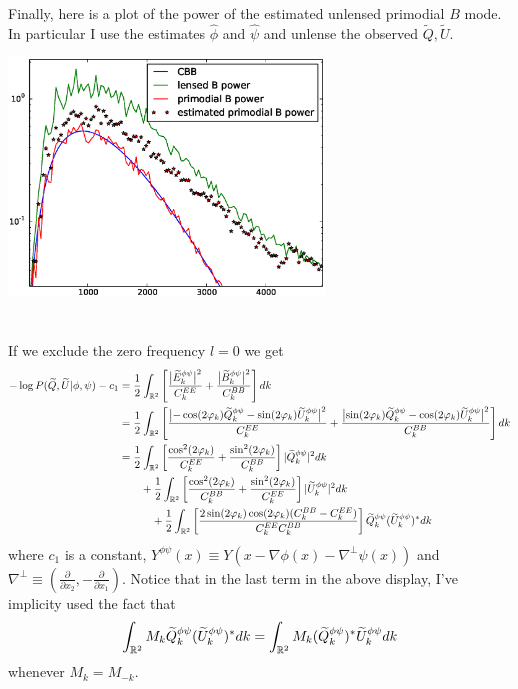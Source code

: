 \documentclass[noinfoline]{imsart}
\begin{document}
Finally, here is a plot of the power of the estimated unlensed primodial $B$ mode. In particular I use the estimates $\hat \phi$ and $\hat \psi$ and unlense the observed $\tilde Q, \tilde U$.
\begin{center}
\includegraphics[height = 2.5in]{spectrum3.eps}
\end{center}


%
%
\appendix

\section{}




If we exclude the zero frequency $l = 0$ we get
\begin{align*}
-\log P( \widetilde Q,  \widetilde U| \phi,\psi) - c_1
&=  \frac{1}{2}\int_{\Bbb R^2}\left[ \frac{\bigl| \widetilde E_k^{\phi\psi}\bigr|^2}{C_k^{EE}}   +  \frac{\bigl| \widetilde B_k^{\phi\psi}\bigr|^2}{C_k^{BB}} \right]dk  \\
&=  \frac{1}{2}\int_{\Bbb R^2}\left[ \frac{\bigl|-\cos(2\varphi_k) \widetilde Q_k^{\phi\psi} -\sin(2\varphi_k) \widetilde U_k^{\phi\psi} \bigr|^2}{C_k^{EE}}   + \frac{\bigl|\sin(2\varphi_k) \widetilde Q_k^{\phi\psi} -\cos(2\varphi_k) \widetilde U_k^{\phi\psi} \bigr|^2}{C_k^{BB}} \right]dk   \\
&=  \frac{1}{2}\int_{\Bbb R^2} \left[\frac{\cos^2(2\varphi_k)}{C_k^{EE}} +\frac{\sin^2(2\varphi_k)}{C_k^{BB}} \right]| \widetilde Q_k^{\phi\psi}|^2   dk\\
&\qquad + \frac{1}{2}\int_{\Bbb R^2}  \left[\frac{\cos^2(2\varphi_k)}{C_k^{BB}} +\frac{\sin^2(2\varphi_k)}{C_k^{EE}}\right] | \widetilde  U_k^{\phi\psi}|^2 dk\\
&\qquad\quad + \frac{1}{2}\int_{\Bbb R^2}\left[ \frac{2\sin(2\varphi_k)\cos(2\varphi_k)(C_k^{BB} - C_k^{EE})}{C_k^{EE} C_k^{BB}}\right] \widetilde  Q_k^{\phi\psi} ( \widetilde U_k^{\phi\psi})^*  dk
\end{align*}
where $c_1$ is a  constant,  $ Y^{\phi\psi}(x)\equiv  Y(x-\nabla \phi(x)-\nabla^\perp \psi(x))$ and $\nabla^\perp \equiv(\frac{\partial}{\partial x_2}, -\frac{\partial}{\partial x_1})$. Notice that in the last term in the above display, I've implicity used the fact that
\[ \int_{\Bbb R^2}M_k \widetilde  Q_k^{\phi\psi} ( \widetilde U_k^{\phi\psi})^*  dk = \int_{\Bbb R^2}M_k ( \widetilde Q_k^{\phi\psi})^* \widetilde  U_k^{\phi\psi}  dk  \]
whenever $M_{k} = M_{-k}$.
\end{document}
